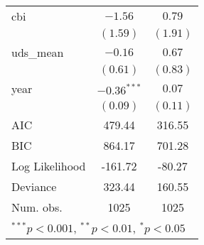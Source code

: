 \begin{tabular}{l c c }
cbi                             & $-1.56$        & $0.79$     \\
                                & $(1.59)$       & $(1.91)$   \\
uds\_mean                       & $-0.16$        & $0.67$     \\
                                & $(0.61)$       & $(0.83)$   \\
year                            & $-0.36^{***}$  & $0.07$     \\
                                & $(0.09)$       & $(0.11)$   \\
\hline
AIC                             & 479.44         & 316.55     \\
BIC                             & 864.17         & 701.28     \\
Log Likelihood                  & -161.72        & -80.27     \\
Deviance                        & 323.44         & 160.55     \\
Num. obs.                       & 1025           & 1025       \\
\hline
\multicolumn{3}{l}{\scriptsize{$^{***}p<0.001$, $^{**}p<0.01$, $^*p<0.05$}}
\end{tabular}
